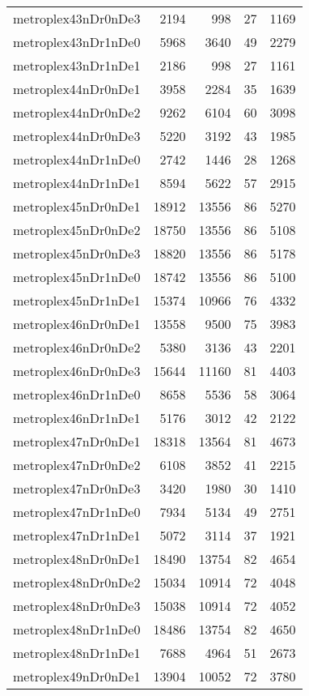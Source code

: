 \begin{tabular}{lrrrr}
metroplex43nDr0nDe3 & 2194 & 998 & 27 & 1169 \\
metroplex43nDr1nDe0 & 5968 & 3640 & 49 & 2279 \\
metroplex43nDr1nDe1 & 2186 & 998 & 27 & 1161 \\
metroplex44nDr0nDe1 & 3958 & 2284 & 35 & 1639 \\
metroplex44nDr0nDe2 & 9262 & 6104 & 60 & 3098 \\
metroplex44nDr0nDe3 & 5220 & 3192 & 43 & 1985 \\
metroplex44nDr1nDe0 & 2742 & 1446 & 28 & 1268 \\
metroplex44nDr1nDe1 & 8594 & 5622 & 57 & 2915 \\
metroplex45nDr0nDe1 & 18912 & 13556 & 86 & 5270 \\
metroplex45nDr0nDe2 & 18750 & 13556 & 86 & 5108 \\
metroplex45nDr0nDe3 & 18820 & 13556 & 86 & 5178 \\
metroplex45nDr1nDe0 & 18742 & 13556 & 86 & 5100 \\
metroplex45nDr1nDe1 & 15374 & 10966 & 76 & 4332 \\
metroplex46nDr0nDe1 & 13558 & 9500 & 75 & 3983 \\
metroplex46nDr0nDe2 & 5380 & 3136 & 43 & 2201 \\
metroplex46nDr0nDe3 & 15644 & 11160 & 81 & 4403 \\
metroplex46nDr1nDe0 & 8658 & 5536 & 58 & 3064 \\
metroplex46nDr1nDe1 & 5176 & 3012 & 42 & 2122 \\
metroplex47nDr0nDe1 & 18318 & 13564 & 81 & 4673 \\
metroplex47nDr0nDe2 & 6108 & 3852 & 41 & 2215 \\
metroplex47nDr0nDe3 & 3420 & 1980 & 30 & 1410 \\
metroplex47nDr1nDe0 & 7934 & 5134 & 49 & 2751 \\
metroplex47nDr1nDe1 & 5072 & 3114 & 37 & 1921 \\
metroplex48nDr0nDe1 & 18490 & 13754 & 82 & 4654 \\
metroplex48nDr0nDe2 & 15034 & 10914 & 72 & 4048 \\
metroplex48nDr0nDe3 & 15038 & 10914 & 72 & 4052 \\
metroplex48nDr1nDe0 & 18486 & 13754 & 82 & 4650 \\
metroplex48nDr1nDe1 & 7688 & 4964 & 51 & 2673 \\
metroplex49nDr0nDe1 & 13904 & 10052 & 72 & 3780 \\

\end{tabular}
